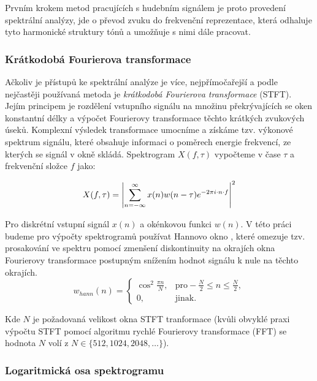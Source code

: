 Prvním krokem metod pracujících s hudebním signálem je proto provedení spektrální analýzy, jde o převod zvuku do frekvenční reprezentace, která odhaluje tyto harmonické struktury tónů a umožňuje s nimi dále pracovat. 

\subsubsection{Krátkodobá Fourierova transformace}

Ačkoliv je přístupů ke spektrální analýze je více, nejpřímočařejší a podle \cite{Dressler2016} nejčastěji používaná metoda je \emph{krátkodobá Fourierova transformace} (STFT). Jejím principem je rozdělení vstupního signálu na množinu překrývajících se oken konstantní délky a výpočet Fourierovy transformace těchto krátkých zvukových úseků. Komplexní výsledek transformace umocníme a získáme tzv. výkonové spektrum signálu, které obsahuje informaci o poměrech energie frekvencí, ze kterých se signál v okně skládá. Spektrogram $X(f, \tau)$ vypočteme v čase $\tau$ a frekvenční složce $f$ jako:


$$ X(f, \tau) = \left|{\sum^{\infty}_{n=-\infty}{x(n)w(n-\tau)e^{-2\pi i \cdot n \cdot f}}}\right|^2 $$

Pro diskrétní vstupní signál $x(n)$ a okénkovou funkci $w(n)$. V této práci budeme pro výpočty spektrogramů používat Hannovo okno \citep{1455106}, které omezuje tzv. prosakování ve spektru pomocí zmenšení diskontinuity na okrajích okna Fourierovy transformace postupným snížením hodnot signálu k nule na těchto okrajích. 
\[
w_{hann}(n) =
\begin{cases}
    \cos^2{\frac{\pi n}{N}}, & \text{pro} -\frac{N}{2} \leq n \leq \frac{N}{2},\\
    0, & \text{jinak}.
\end{cases}
\]

Kde $N$ je požadovaná velikost okna STFT tranformace (kvůli obvyklé praxi výpočtu STFT pomocí algoritmu rychlé Fourierovy transformace (FFT) se hodnota $N$ volí z $N \in \{512, 1024, 2048, \dots\}$).

\subsubsection{Logaritmická osa spektrogramu}

